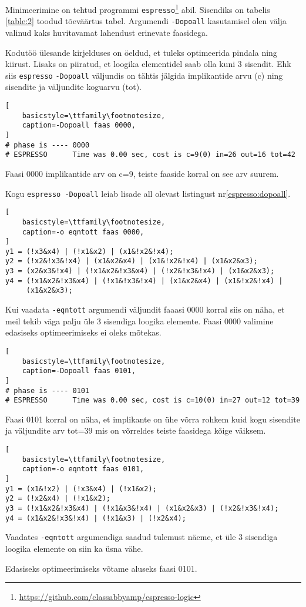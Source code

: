 Minimeerimine on tehtud programmi \verb|espresso|\footnote{\url{https://github.com/classabbyamp/espresso-logic}} abil. Sisendiks on tabelis \ref{table:2} toodud tõeväärtus tabel.
Argumendi \verb|-Dopoall| kasutamisel olen välja valinud kaks huvitavamat lahendust erinevate faasidega.

Kodutöö ülesande kirjelduses on öeldud, et tuleks optimeerida pindala ning kiirust. Lisaks on piiratud, et loogika elementidel saab olla kuni 3 sisendit.
Ehk siis \verb|espresso| \verb|-Dopoall| väljundis on tähtis jälgida implikantide arvu (c) ning sisendite ja väljundite koguarvu (tot).

\begin{lstlisting}[
    basicstyle=\ttfamily\footnotesize,
    caption=-Dopoall faas 0000,
]
# phase is ---- 0000
# ESPRESSO  	Time was 0.00 sec, cost is c=9(0) in=26 out=16 tot=42
\end{lstlisting}

Faasi 0000 implikantide arv on c=9, teiste faaside korral on see arv suurem.

Kogu \verb|espresso -Dopoall| leiab lisade all olevast listingust nr\ref{espresso:dopoall}.

\begin{lstlisting}[
    basicstyle=\ttfamily\footnotesize,
    caption=-o eqntott faas 0000,
]
y1 = (!x3&x4) | (!x1&x2) | (x1&!x2&!x4);
y2 = (!x2&!x3&!x4) | (x1&x2&x4) | (x1&!x2&!x4) | (x1&x2&x3);
y3 = (x2&x3&!x4) | (!x1&x2&!x3&x4) | (!x2&!x3&!x4) | (x1&x2&x3);
y4 = (!x1&x2&!x3&x4) | (!x1&!x3&!x4) | (x1&x2&x4) | (x1&!x2&!x4) |
     (x1&x2&x3);
\end{lstlisting}

Kui vaadata \verb|-eqntott| argumendi väljundit faaasi 0000 korral siis on näha, et meil tekib väga palju üle 3 sisendiga loogika elemente. Faasi 0000 valimine edasiseks optimeerimiseks ei oleks mõtekas.

\begin{lstlisting}[
    basicstyle=\ttfamily\footnotesize,
    caption=-Dopoall faas 0101,
]
# phase is ---- 0101
# ESPRESSO  	Time was 0.00 sec, cost is c=10(0) in=27 out=12 tot=39
\end{lstlisting}

Faasi 0101 korral on näha, et implikante on ühe võrra rohkem kuid kogu sisendite ja väljundite arv tot=39 mis on võrreldes teiste faasidega kõige väiksem.

\begin{lstlisting}[
    basicstyle=\ttfamily\footnotesize,
    caption=-o eqntott faas 0101,
]
y1 = (x1&!x2) | (!x3&x4) | (!x1&x2);
y2 = (!x2&x4) | (!x1&x2);
y3 = (!x1&x2&!x3&x4) | (!x1&x3&!x4) | (x1&x2&x3) | (!x2&!x3&!x4);
y4 = (x1&x2&!x3&!x4) | (!x1&x3) | (!x2&x4);
\end{lstlisting}

Vaadates \verb|-eqntott| argumendiga saadud tulemust näeme, et üle 3 sisendiga loogika elemente on siin ka üsna vähe.

Edasiseks optimeerimiseks võtame aluseks faasi 0101.